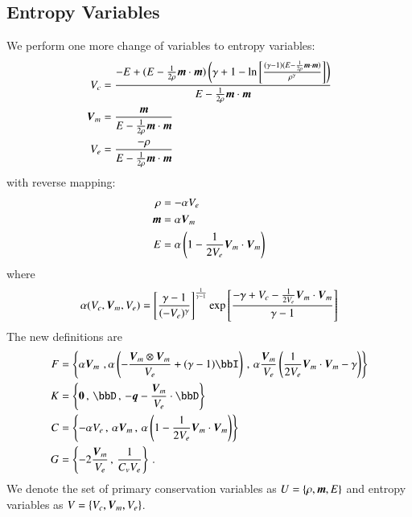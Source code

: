 \documentclass[preprint,12pt]{elsarticle}
\begin{document}
\subsection{Entropy Variables}
We perform one more change of variables to entropy variables:
\begin{align*}
V_c&=\frac{-E+(E-\frac{1}{2\rho}\boldsymbol m\cdot\boldsymbol m)\left( \gamma+1-\ln\left[ \frac{(\gamma-1)(E-\frac{1}{2\rho}\boldsymbol m\cdot\boldsymbol m)}{\rho^\gamma} \right] \right)}
{E-\frac{1}{2\rho}\boldsymbol m\cdot\boldsymbol m}\\
\boldsymbol V_m&=\frac{\boldsymbol m}{E-\frac{1}{2\rho}\boldsymbol m\cdot\boldsymbol m}\\
V_e&=\frac{-\rho}{E-\frac{1}{2\rho}\boldsymbol m\cdot\boldsymbol m}\\
\end{align*}
with reverse mapping:
\begin{align*}
\rho&=-\alpha V_e\\
\boldsymbol m&=\alpha\boldsymbol V_m\\
E&=\alpha\left( 1-\frac{1}{2V_e}\boldsymbol V_m\cdot\boldsymbol V_m \right)\\
\end{align*}
where 
\[
\alpha(V_c,\boldsymbol V_m,V_e)=\left[ \frac{\gamma-1}{(-V_e)^\gamma} \right]^{\frac{1}{\gamma-1}}\exp\left[ \frac{-\gamma+V_c-\frac{1}{2V_e}\boldsymbol V_m\cdot\boldsymbol V_m}{\gamma-1} \right]
\]
The new definitions are
\begin{align*}
F&=\LRc{\alpha\bfV_m\,\,,
\alpha\LRp{-\frac{\bfV_m\otimes\bfV_m}{V_e}+(\gamma-1)\bbI}\,,\,
\alpha\frac{\bfV_m}{V_e}\LRp{\frac{1}{2V_e}\bfV_m\cdot\bfV_m-\gamma}}\\
K&=\LRc{\boldsymbol 0\,,\,
\bbD\,,\,
-\bfq-\frac{\bfV_m}{V_e}\cdot\bbD}\\
C&=\LRc{-\alpha V_e\,,\,
\alpha\bfV_m\,,\,
\alpha\LRp{1-\frac{1}{2V_e}\bfV_m\cdot\bfV_m}}\\
G&=\LRc{-2\frac{\bfV_m}{V_e}\,,\,
\frac{1}{C_vV_e}}\,.
\end{align*}
We denote the set of primary conservation variables as $U=\left\{ \rho,\boldsymbol m,E \right\}$ and entropy variables as $V=\left\{ V_c,\boldsymbol V_m,V_e \right\}$.

%                                                                                                                  
%                                                                                                                  
%   
\end{document}
